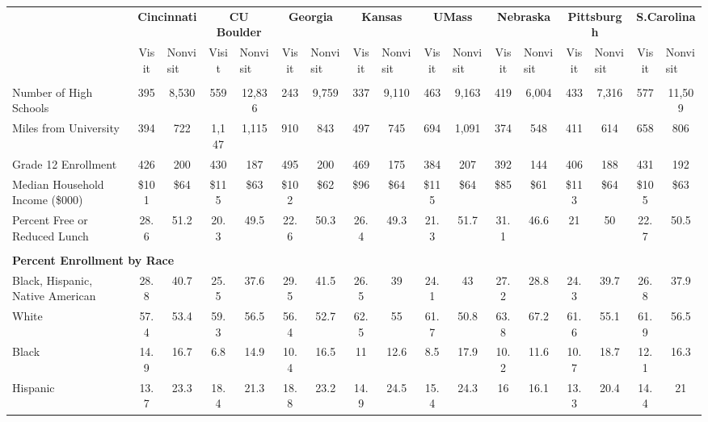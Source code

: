 \begin{tabular*}{\linewidth}{@{\extracolsep{\fill} } lcccccccccccccccc}%
&\multicolumn{2}{c}{\bfseries Cincinnati}&\multicolumn{2}{c}{\bfseries CU Boulder}&\multicolumn{2}{c}{\bfseries Georgia}&\multicolumn{2}{c}{\bfseries Kansas}&\multicolumn{2}{c}{\bfseries UMass}&\multicolumn{2}{c}{\bfseries Nebraska}&\multicolumn{2}{c}{\bfseries Pittsburgh}&\multicolumn{2}{c}{\bfseries S.Carolina}\\%
&Visit&\multicolumn{1}{l}{Nonvisit}&Visit&\multicolumn{1}{l}{Nonvisit}&Visit&\multicolumn{1}{l}{Nonvisit}&Visit&\multicolumn{1}{l}{Nonvisit}&Visit&\multicolumn{1}{l}{Nonvisit}&Visit&\multicolumn{1}{l}{Nonvisit}&Visit&\multicolumn{1}{l}{Nonvisit}&Visit&\multicolumn{1}{l}{Nonvisit}\\%
\hline%
&&&&&&&&&&&&&&&&\\%
\hspace{0cm}Number of High Schools&395&8,530&559&12,836&243&9,759&337&9,110&463&9,163&419&6,004&433&7,316&577&11,509\\%
\hspace{0cm}Miles from University&394&722&1,147&1,115&910&843&497&745&694&1,091&374&548&411&614&658&806\\%
\hspace{0cm}Grade 12 Enrollment&426&200&430&187&495&200&469&175&384&207&392&144&406&188&431&192\\%
\hspace{0cm}Median Household Income (\$000)&\$101&\$64&\$115&\$63&\$102&\$62&\$96&\$64&\$115&\$64&\$85&\$61&\$113&\$64&\$105&\$63\\%
\hspace{0cm}Percent Free or Reduced Lunch&28.6&51.2&20.3&49.5&22.6&50.3&26.4&49.3&21.3&51.7&31.1&46.6&21&50&22.7&50.5\\%
&&&&&&&&&&&&&&&&\\%
\multicolumn{17}{l}{\bfseries Percent Enrollment by Race}\\%
\hspace{0.2cm}Black, Hispanic, Native American&28.8&40.7&25.5&37.6&29.5&41.5&26.5&39&24.1&43&27.2&28.8&24.3&39.7&26.8&37.9\\%
\hspace{0.2cm}White&57.4&53.4&59.3&56.5&56.4&52.7&62.5&55&61.7&50.8&63.8&67.2&61.6&55.1&61.9&56.5\\%
\hspace{0.2cm}Black&14.9&16.7&6.8&14.9&10.4&16.5&11&12.6&8.5&17.9&10.2&11.6&10.7&18.7&12.1&16.3\\%
\hspace{0.2cm}Hispanic&13.7&23.3&18.4&21.3&18.8&23.2&14.9&24.5&15.4&24.3&16&16.1&13.3&20.4&14.4&21\\%

\end{tabular*}
